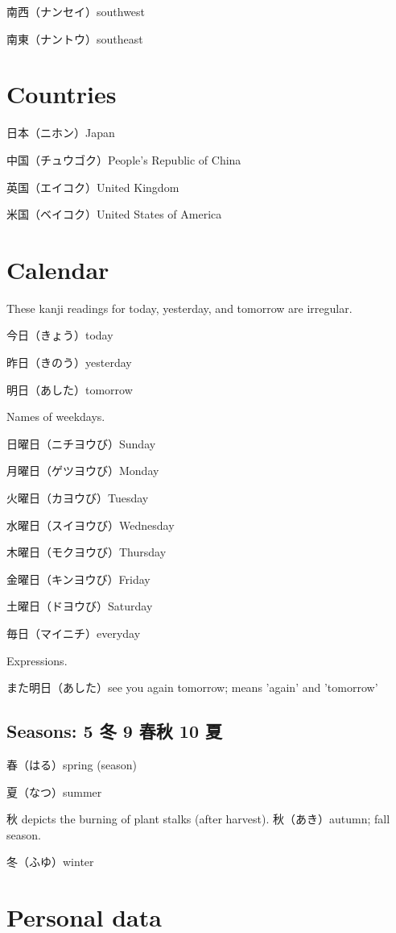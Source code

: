 南西（ナンセイ）southwest

南東（ナントウ）southeast

\section{Countries}

日本（ニホン）Japan

中国（チュウゴク）People's Republic of China

英国（エイコク）United Kingdom

米国（ベイコク）United States of America

\section{Calendar}

These kanji readings for today, yesterday, and tomorrow are irregular.

今日（きょう）today

昨日（きのう）yesterday

明日（あした）tomorrow

Names of weekdays.

日曜日（ニチヨウび）Sunday

月曜日（ゲツヨウび）Monday

火曜日（カヨウび）Tuesday

水曜日（スイヨウび）Wednesday

木曜日（モクヨウび）Thursday

金曜日（キンヨウび）Friday

土曜日（ドヨウび）Saturday

毎日（マイニチ）everyday

Expressions.

また明日（あした）see you again tomorrow; means 'again' and 'tomorrow'

\subsection{Seasons: 5 冬 9 春秋 10 夏}

春（はる）spring (season)

夏（なつ）summer

秋 depicts the burning of plant stalks (after harvest).
秋（あき）autumn; fall season.

冬（ふゆ）winter

\section{Personal data}


